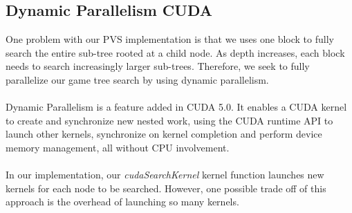 \subsection{Dynamic Parallelism CUDA}
One problem with our PVS implementation is that we uses one block to fully search the entire sub-tree rooted at a child node. As depth increases, each block needs to search increasingly larger sub-trees. Therefore, we seek to fully parallelize our game tree search by using dynamic parallelism. \cite{dp}\\
\\
Dynamic Parallelism is a feature added in CUDA 5.0. It enables a CUDA kernel to create and synchronize new nested work, using the CUDA runtime API to launch other kernels, synchronize on kernel completion and perform device memory management, all without CPU involvement. \cite{dp2}\\
\\
In our implementation, our \textit{cudaSearchKernel} kernel function launches new kernels for each node to be searched. However, one possible trade off of this approach is the overhead of launching so many kernels.\\

